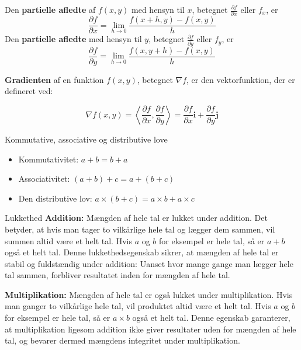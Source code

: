 \begin{definition}
Den \textbf{partielle afledte} af \( f(x, y) \) med hensyn til \( x \), betegnet \( \frac{\partial f}{\partial x} \) eller \( f_x \), er
$$
\frac{\partial f}{\partial x} = \lim_{h \to 0} \frac{f(x+h, y) - f(x, y)}{h}
$$
Den \textbf{partielle afledte} med hensyn til \( y \), betegnet \( \frac{\partial f}{\partial y} \) eller \( f_y \), er
$$
\frac{\partial f}{\partial y} = \lim_{h \to 0} \frac{f(x, y+h) - f(x, y)}{h}
$$
\end{definition}

\begin{definition}[Gradienten]
\textbf{Gradienten} af en funktion \( f(x, y) \), betegnet \( \nabla f \), er den vektorfunktion, der er defineret ved:

$$
\nabla f(x, y) = \left\langle \frac{\partial f}{\partial x}, \frac{\partial f}{\partial y} \right\rangle = \frac{\partial f}{\partial x} \mathbf{i} + \frac{\partial f}{\partial y} \mathbf{j}
$$

\end{definition}


\begin{custombox}{{Kommutative, associative og distributive love}}


    \begin{itemize}
    \item Kommutativitet: $a+b=b+a$
    \item Associativitet: $(a+b)+c=a+(b+c)$
    \item Den distributive lov: $a \times(b+c)=a \times b+a \times c$
    \end{itemize}
    
\end{custombox}

\begin{custombox}{Lukkethed}
    \textbf{Addition:} Mængden af hele tal er lukket under addition. Det betyder, at hvis man tager to vilkårlige hele tal og lægger dem sammen, vil summen altid være et helt tal. Hvis \(a\) og \(b\) for eksempel er hele tal, så er \(a + b\) også et helt tal. Denne lukkethedsegenskab sikrer, at mængden af hele tal er stabil og fuldstændig under addition: Uanset hvor mange gange man lægger hele tal sammen, forbliver resultatet inden for mængden af hele tal.

\textbf{Multiplikation:} Mængden af hele tal er også lukket under multiplikation. Hvis man ganger to vilkårlige hele tal, vil produktet altid være et helt tal. Hvis \(a\) og \(b\) for eksempel er hele tal, så er \(a \times b\) også et helt tal. Denne egenskab garanterer, at multiplikation ligesom addition ikke giver resultater uden for mængden af hele tal, og bevarer dermed mængdens integritet under multiplikation.

\end{custombox}

